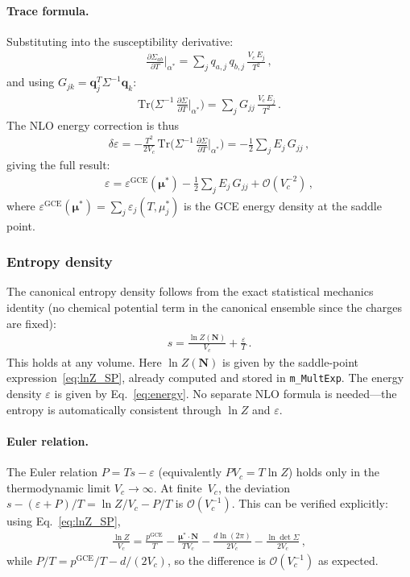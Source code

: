 \documentclass[11pt]{article}
\newcommand{\bmu}{\bm{\mu}}
\newcommand{\bq}{\mathbf{q}}
\newcommand{\bN}{\mathbf{N}}
\newcommand{\Tr}{\mathrm{Tr}}
\newcommand{\GCE}{\mathrm{GCE}}
\begin{document}
\paragraph{Trace formula.}
Substituting into the susceptibility derivative:
\begin{align}
  \frac{\partial\Sigma_{ab}}{\partial T}\bigg|_{\alpha^*}
  = \sum_j q_{a,j}\,q_{b,j}\,\frac{V_c\,E_j}{T^2} \,,
\end{align}
and using $G_{jk} = \bq_j^T\Sigma^{-1}\bq_k$:
\begin{align}
  \Tr\!\Big(\Sigma^{-1}\,\frac{\partial\Sigma}{\partial T}\Big\rvert_{\alpha^*}\Big)
  = \sum_j G_{jj}\,\frac{V_c\,E_j}{T^2} \,.
\end{align}
The NLO energy correction is thus
\begin{align}
  \delta\varepsilon = -\frac{T^2}{2V_c}\,\Tr\!\Big(\Sigma^{-1}\,\frac{\partial\Sigma}{\partial T}\Big\rvert_{\alpha^*}\Big)
  = -\frac{1}{2}\sum_j E_j\,G_{jj} \,,
\end{align}
giving the full result:
\begin{align}
  \varepsilon = \varepsilon^{\GCE}(\bmu^*)
  - \frac{1}{2}\sum_j E_j\,G_{jj}
  + \mathcal{O}(V_c^{-2}) \,,
  \label{eq:energy}
\end{align}
where $\varepsilon^{\GCE}(\bmu^*) = \sum_j \varepsilon_j(T,\mu_j^*)$ is the GCE energy density at the saddle point.

\subsubsection{Entropy density}

The canonical entropy density follows from the exact statistical mechanics identity (no chemical potential term in the canonical ensemble since the charges are fixed):
\begin{align}
  s = \frac{\ln Z(\bN)}{V_c} + \frac{\varepsilon}{T} \,.
  \label{eq:entropy}
\end{align}
This holds at any volume.
Here $\ln Z(\bN)$ is given by the saddle-point expression~\eqref{eq:lnZ_SP}, already computed and stored in \texttt{m\_MultExp}.
The energy density $\varepsilon$ is given by Eq.~\eqref{eq:energy}.
No separate NLO formula is needed---the entropy is automatically consistent through $\ln Z$ and $\varepsilon$.

\paragraph{Euler relation.}
The Euler relation $P = Ts - \varepsilon$ (equivalently $PV_c = T\ln Z$) holds only in the thermodynamic limit $V_c \to \infty$.
At finite~$V_c$, the deviation $s - (\varepsilon + P)/T = \ln Z/V_c - P/T$ is $\mathcal{O}(V_c^{-1})$.
This can be verified explicitly: using Eq.~\eqref{eq:lnZ_SP},
\begin{align}
  \frac{\ln Z}{V_c} = \frac{p^{\GCE}}{T} - \frac{\bmu^*\cdot\bN}{TV_c} - \frac{d\ln(2\pi)}{2V_c} - \frac{\ln\det\Sigma}{2V_c} \,,
\end{align}
while $P/T = p^{\GCE}/T - d/(2V_c)$, so the difference is $\mathcal{O}(V_c^{-1})$ as expected.
\end{document}
